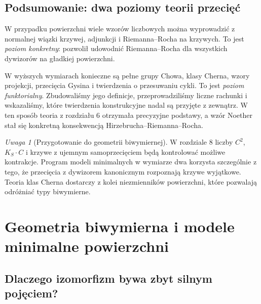 \documentclass[11pt,a4paper,openany]{report}
\numberwithin{equation}{section}
\theoremstyle{plain}
\theoremstyle{definition}
\theoremstyle{remark}
\newtheorem{uwaga}[twierdzenie]{Uwaga}
\begin{document}
\section{Podsumowanie: dwa poziomy teorii przecięć}
\label{sec:ga7-summary}

W przypadku powierzchni wiele wzorów liczbowych można
wyprowadzić z normalnej wiązki krzywej, adjunkcji
i Riemanna--Rocha na krzywych. To jest \emph{poziom
konkretny}: pozwolił udowodnić Riemanna--Rocha dla
wszystkich dywizorów na gładkiej powierzchni.

W wyższych wymiarach konieczne są pełne grupy Chowa,
klasy Cherna, wzory projekcji, przecięcia Gysina
i twierdzenia o przesuwaniu cykli. To jest
\emph{poziom funktorialny}. Zbudowaliśmy jego definicje,
przeprowadziliśmy liczne rachunki i wskazaliśmy,
które twierdzenia konstrukcyjne nadal są przyjęte
z zewnątrz. W ten sposób teoria z rozdziału 6
otrzymała precyzyjne podstawy, a wzór Noether
stał się konkretną konsekwencją
Hirzebrucha--Riemanna--Rocha.

\begin{uwaga}[Przygotowanie do geometrii biwymiernej]
W rozdziale 8 liczby $C^2$, $K_S\cdot C$ i krzywe
z ujemnym samoprzecięciem będą kontrolować możliwe
kontrakcje. Program modeli minimalnych w wymiarze dwa
korzysta szczególnie z tego, że przecięcia z dywizorem
kanonicznym rozpoznają krzywe wyjątkowe. Teoria
klas Cherna dostarczy z kolei niezmienników powierzchni,
które pozwalają odróżniać typy biwymierne.
\end{uwaga}


\chapter{Geometria biwymierna i modele minimalne powierzchni}
\label{ch:ga8-biwymierna}

\section{Dlaczego izomorfizm bywa zbyt silnym pojęciem?}
\label{sec:ga8-motivation}
\end{document}
